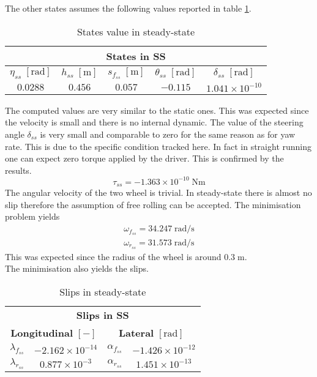 The other states assumes the following values reported in table \ref{tab:StatesSS}.

%
\begin{table}[h!]
    \centering
    \begin{tabular}{@{}ccccc@{}}
    \toprule
    \multicolumn{5}{c}{\textbf{States in SS}} \\ \midrule
    ${  \eta_{ss}} \; [\si{\radian}]$ & ${ h_{ss}} \; [\si{\metre}]$ & ${ s_{f_{ss}}} \; [\si{\metre}]$ &  ${  \theta_{ss}} \; [\si{\radian}]$ & ${ \delta_{ss}} \; [\si{\radian}]$ \\
    $0.0288  $ & $0.456  $ & $0.057 $ & $-0.115 $ & $1.041\times10^{-10}$ \\ \bottomrule
    \end{tabular}
    \caption{States value in steady-state}
    \label{tab:StatesSS}
\end{table}
%

The computed values are very similar to the static ones. This was expected since the velocity is small and there is no internal dynamic. The value of the steering angle $\delta_{ss}$ is very small and comparable to zero for the same reason as for yaw rate. This is due to the specific condition tracked here. In fact in straight running one can expect zero torque applied by the driver. This is confirmed by the results.
%
\begin{equation}
    \tau_{ss}   = -1.363\times10^{-10} \; \si{\newton\metre}
\end{equation}
%
The angular velocity of the two wheel is trivial. In steady-state there is almost no slip therefore the assumption of free rolling can be accepted. The minimisation problem yields
%
\begin{equation}
    \begin{array}{l}
        \omega_{f_{ss}}   = 34.247 \; \si{\radian/\second}\\       
        \omega_{r_{ss}}   = 31.573 \; \si{\radian/\second}
    \end{array}
\end{equation}
%
This was expected since the radius of the wheel is around $0.3\; \si{\metre}$.\\
The minimisation also yields the slips.

\begin{table}[h!]
    \centering
    \begin{tabular}{@{}cccc@{}}
    \toprule
    \multicolumn{4}{c}{\textbf{Slips in SS}}                         \\
    \multicolumn{2}{c}{\textbf{Longitudinal} $[-]$} & \multicolumn{2}{c}{\textbf{Lateral} $[\si{\radian}]$} \\ \midrule
    $\lambda_{f_{ss}}$ & $-2.162\times10^{-14}$ & $\alpha_{f_{ss}} $ & $-1.426\times10^{-12}$\\     
    $\lambda_{r_{ss}}$ & $ 0.877\times10^{-3} $ & $\alpha_{r_{ss}} $ & $1.451\times10^{-13} $ \\ \bottomrule
    \end{tabular}
    \caption{Slips in steady-state}
    \label{tab:slipsSS}
\end{table}

